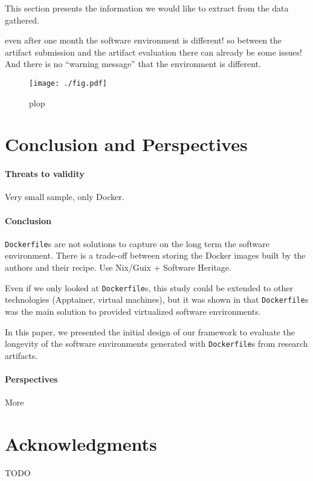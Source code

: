 \documentclass[sigconf,natbib=false]{acmart}
\newcommand{\df}{\texttt{Dockerfile}}
\begin{document}
This section presents the information we would like to extract from the data gathered.

even after one month the software environment is different!
so between the artifact submission and the artifact evaluation there can already be some issues!
And there is no ``warning message'' that the environment is different.

\begin{figure*}
  \centering
  \texttt{[image: ./fig.pdf]}
  \caption{plop}
\end{figure*}


\newpage
\section{Conclusion and Perspectives}

\paragraph{Threats to validity}
Very small sample, only Docker.

\paragraph{Conclusion}

\texttt{Dockerfile}s are not solutions to capture on the long term the software environment.
There is a trade-off between storing the Docker images built by the authors and their recipe.
Use Nix/Guix + Software Heritage.

Even if we only looked at \df s, this study could be extended to other technologies (Apptainer, virtual machines), but it was shown in \cite{guilloteau2024longevity} that \df s was the main solution to provided virtualized software environments.

In this paper, we presented the initial design of our framework to evaluate the longevity of the software environments generated with \df s from research artifacts.

\paragraph{Perspectives}

More

%

\section*{Acknowledgments}

TODO


\newpage
%
%
\printbibliography
\end{document}
